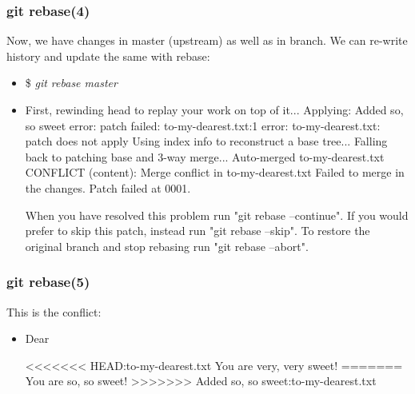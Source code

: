 \documentclass[10pt]{beamer}
\newcommand{\command}[1]{\textsl{\textit{#1}}}
\begin{document}
%
%

\begin{frame}[fragile]
\frametitle{git rebase(4)}
Now, we have changes in master (upstream) as well as in branch. 
We can re-write history and update the same with rebase:
\begin{block}{}
\scriptsize
\begin{semiverbatim}
\begin{itemize}[<+-| alert@+>]
\item[]{\$ \command{git rebase master}}
\item[]{First, rewinding head to replay your work on top of it... 
Applying: Added so, so sweet 
error: patch failed: to-my-dearest.txt:1 
error: to-my-dearest.txt: patch does not apply 
Using index info to reconstruct a base tree... 
Falling back to patching base and 3-way merge... 
Auto-merged to-my-dearest.txt 
CONFLICT (content): Merge conflict in to-my-dearest.txt 
Failed to merge in the changes. 
Patch failed at 0001. 

When you have resolved this problem run "git rebase --continue". 
If you would prefer to skip this patch, instead run "git rebase --skip". 
To restore the original branch and stop rebasing run "git rebase --abort".}
\end{itemize}
\end{semiverbatim}
\end{block}

\end{frame}

%
%

\begin{frame}[fragile]
\frametitle{git rebase(5)}
This is the conflict:
\begin{block}{}
\scriptsize
\begin{semiverbatim}
\begin{itemize}[<+-| alert@+>]
\item[]{Dear

<<<<<<< HEAD:to-my-dearest.txt
You are very, very sweet!
=======
You are so, so sweet!
>>>>>>> Added so, so sweet:to-my-dearest.txt}
\end{itemize}
\end{semiverbatim}
\end{block}


\end{frame}
\end{document}
